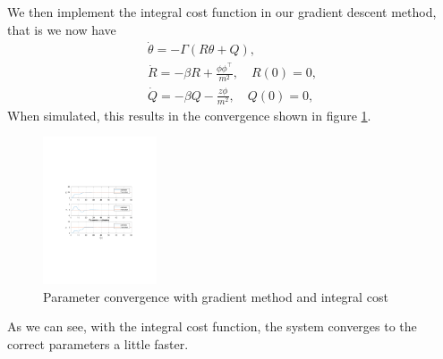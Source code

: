 \documentclass[]{article}
\begin{document}
We then implement the integral cost function in our gradient descent method, that is we now have
\begin{align}
\dot \theta = -\Gamma (R \theta + Q), \\
\dot R = -\beta R + \frac{\phi \phi^\top}{m^2}, \quad R(0) = 0, \\
\dot Q = -\beta Q - \frac{z \phi}{m^2}, \quad Q(0) = 0,
\end{align}
When simulated, this results in the convergence shown in figure \ref{fig:int_results}.
\begin{figure}[H]
\centering
\includegraphics[width=0.3\textwidth, trim={8cm 8cm 8cm 8cm, clip}]{int_plots}
\caption{Parameter convergence with gradient method and integral cost}
\label{fig:int_results}
\end{figure}
As we can see, with the integral cost function, the system converges to the correct parameters a little faster.
\end{document}
